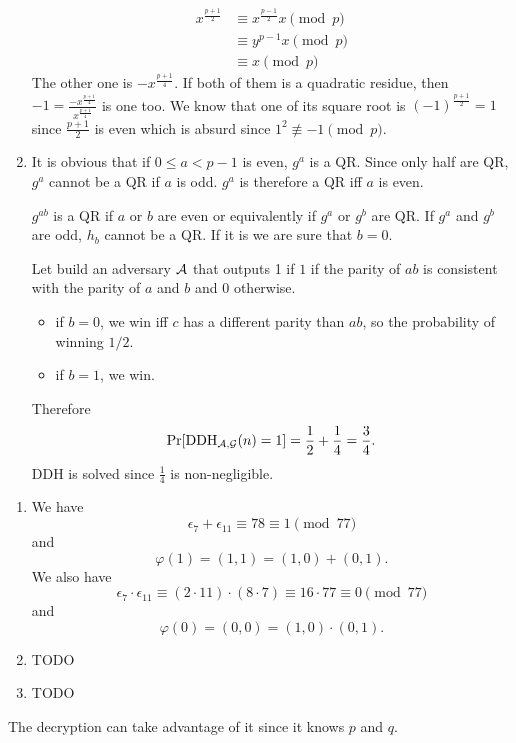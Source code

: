 \begin{solution}
\begin{enumerate}
      \begin{align*}
        x^{\frac{p+1}{2}}
        & \equiv x^{\frac{p-1}{2}}x \pmod{p}\\
        & \equiv y^{p-1}x \pmod{p}\\
        & \equiv x \pmod{p}
      \end{align*}
      The other one is $-x^{\frac{p+1}{4}}$.
      If both of them is a quadratic residue, then $-1 = \frac{-x^{\frac{p+1}{4}}}{x^{\frac{p+1}{4}}}$ is one too.
      We know that one of its square root is $(-1)^{\frac{p+1}{2}} = 1$ since $\frac{p+1}{2}$ is even which is absurd
      since $1^2 \not\equiv -1 \pmod{p}$.
    \item
      It is obvious that if $0 \leq a < p-1$ is even, $g^a$ is a QR.
      Since only half are QR, $g^a$ cannot be a QR if $a$ is odd.
      $g^a$ is therefore a QR iff $a$ is even.

      $g^{ab}$ is a QR if $a$ or $b$ are even or equivalently
      if $g^a$ or $g^b$ are QR.
      If $g^a$ and $g^b$ are odd, $h_b$ cannot be a QR.
      If it is we are sure that $b = 0$.

      Let build an adversary $\mathcal{A}$ that outputs 1 if $1$ if the parity of
      $ab$ is consistent with the parity of $a$ and $b$ and $0$ otherwise.
      \begin{itemize}
        \item if $b = 0$, we win iff $c$ has a different parity than $ab$, so the probability of winning $1/2$.
        \item if $b = 1$, we win.
      \end{itemize}
      Therefore
      \[ \Pr[\operatorname{DDH}_{\mathcal{A},\mathcal{G}}(n) = 1] = \frac{1}{2} + \frac{1}{4} = \frac{3}{4}. \]
      DDH is solved since $\frac{1}{4}$ is non-negligible.
  \end{enumerate}
\end{solution}

\begin{solution}
  \begin{enumerate}
    \item
      We have
      \[ \epsilon_7 + \epsilon_{11} \equiv 78 \equiv 1 \pmod{77} \]
      and
      \[ \varphi(1) = (1,1) = (1,0) + (0,1). \]
      We also have
      \[ \epsilon_7 \cdot \epsilon_{11} \equiv (2 \cdot 11) \cdot (8 \cdot 7) \equiv 16 \cdot 77 \equiv 0 \pmod{77} \]
      and
      \[ \varphi(0) = (0,0) = (1,0) \cdot (0,1). \]
    \item TODO
    \item TODO
  \end{enumerate}
  The decryption can take advantage of it since it knows $p$ and $q$.
\end{solution}

